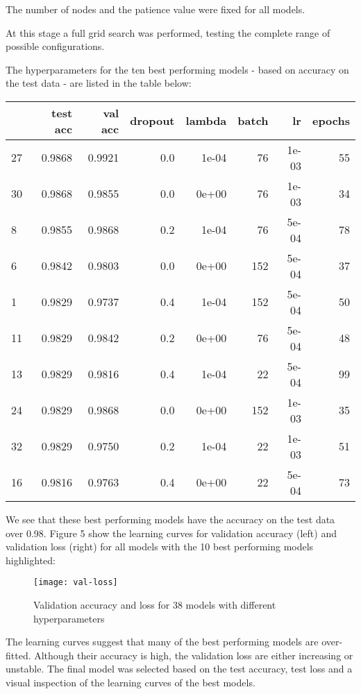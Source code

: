 \documentclass[]{article}
\begin{document}
The number of nodes and the patience value were fixed for all models.

At this stage a full grid search was performed, testing the complete
range of possible configurations.

The hyperparameters for the ten best performing models - based on
accuracy on the test data - are listed in the table below:

\begin{table}[H]
\centering
\begin{tabular}{l|r|r|r|r|r|r|r}
\hline
  & test acc & val acc & dropout & lambda & batch & lr & epochs\\
\hline
27 & 0.9868 & 0.9921 & 0.0 & 1e-04 & 76 & 1e-03 & 55\\
\hline
30 & 0.9868 & 0.9855 & 0.0 & 0e+00 & 76 & 1e-03 & 34\\
\hline
8 & 0.9855 & 0.9868 & 0.2 & 1e-04 & 76 & 5e-04 & 78\\
\hline
6 & 0.9842 & 0.9803 & 0.0 & 0e+00 & 152 & 5e-04 & 37\\
\hline
1 & 0.9829 & 0.9737 & 0.4 & 1e-04 & 152 & 5e-04 & 50\\
\hline
11 & 0.9829 & 0.9842 & 0.2 & 0e+00 & 76 & 5e-04 & 48\\
\hline
13 & 0.9829 & 0.9816 & 0.4 & 1e-04 & 22 & 5e-04 & 99\\
\hline
24 & 0.9829 & 0.9868 & 0.0 & 0e+00 & 152 & 1e-03 & 35\\
\hline
32 & 0.9829 & 0.9750 & 0.2 & 1e-04 & 22 & 1e-03 & 51\\
\hline
16 & 0.9816 & 0.9763 & 0.4 & 0e+00 & 22 & 5e-04 & 73\\
\hline
\end{tabular}
\end{table}

We see that these best performing models have the accuracy on the test
data over 0.98. Figure 5 show the learning curves for validation
accuracy (left) and validation loss (right) for all models with the 10
best performing models highlighted:

\begin{figure}

{\centering \texttt{[image: val-loss]} 

}

\caption{Validation accuracy and loss for 38 models with different hyperparameters}\label{fig:unnamed-chunk-9}
\end{figure}

The learning curves suggest that many of the best performing models are
over-fitted. Although their accuracy is high, the validation loss are
either increasing or unstable. The final model was selected based on the
test accuracy, test loss and a visual inspection of the learning curves
of the best models.
\end{document}
